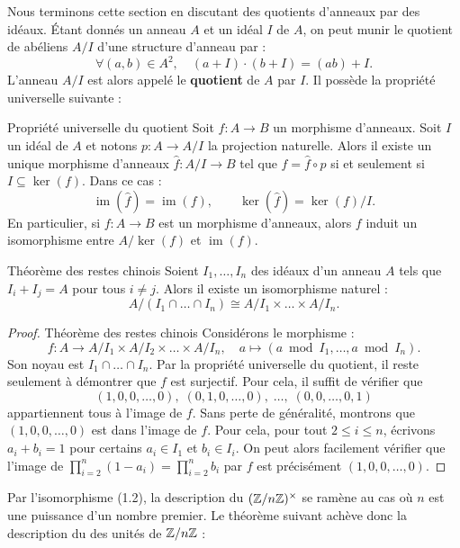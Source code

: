 \documentclass[]{report}
\begin{document}
Nous terminons cette section en discutant des quotients d'anneaux par des idéaux. Étant donnés un anneau $A$ et un idéal $I$ de $A$, on peut munir le quotient de \grs abéliens $A/I$ d'une structure d'anneau par :
\[\forall (a, b) \in A^2, \quad (a + I) \cdot (b + I) = (ab) + I.\]
L'anneau $A/I$ est alors appelé le \textbf{quotient} de $A$ par $I$. Il possède la propriété universelle suivante :

\begin{tm}{Propriété universelle du quotient}{}
    Soit $f : A \to B$ un morphisme d'anneaux. Soit $I$ un idéal de $A$ et notons $p : A \to A/I$ la projection naturelle. Alors il existe un unique morphisme d'anneaux $\hat{f} : A/I \to B$ tel que $f = \hat{f} \circ p$ si et seulement si $I \subseteq \ker(f)$. Dans ce cas :
    \[\operatorname{im}(\hat{f}) = \operatorname{im}(f), \qquad \ker(\hat{f}) = \ker(f)/I.\]
    En particulier, si $f : A \to B$ est un morphisme d'anneaux, alors $f$ induit un isomorphisme entre $A/\ker(f)$ et $\operatorname{im}(f)$.
\end{tm}

\begin{tm}{Théorème des restes chinois}{}
    Soient $I_1, \ldots, I_n$ des idéaux d'un anneau $A$ tels que $I_i + I_j = A$ pour tous $i \neq j$. Alors il existe un isomorphisme naturel :
    \[A/(I_1 \cap \dots \cap I_n) \cong A/I_1 \times \dots \times A/I_n.\]
\end{tm}

\begin{proof}{Théorème des restes chinois}{}
    Considérons le morphisme :
    \[f : A \to A/I_1 \times A/I_2 \times \dots \times A/I_n, \quad a \mapsto (a \bmod I_1, \dots, a \bmod I_n).\]
    Son noyau est $I_1 \cap \ldots \cap I_n$. Par la propriété universelle du quotient, il reste seulement à démontrer que $f$ est surjectif. Pour cela, il suffit de vérifier que
    \[(1, 0, 0, \dots, 0), \; (0, 1, 0, \dots, 0), \; \dots, \; (0, 0, \dots, 0, 1)\]
    appartiennent tous à l'image de $f$. Sans perte de généralité, montrons que $(1, 0, 0, \ldots, 0)$ est dans l'image de $f$. Pour cela, pour tout $2 \le i \le n$, écrivons $a_i + b_i = 1$ pour certains $a_i \in I_1$ et $b_i \in I_i$. On peut alors facilement vérifier que l'image de $\prod_{i=2}^{n}(1 - a_i) = \prod_{i=2}^{n} b_i$ par $f$ est précisément $(1, 0, 0, \ldots, 0)$.
\end{proof}

Par l'isomorphisme (1.2), la description du \gr $(\mathbb{Z}/n\mathbb{Z})^{\times}$ se ramène au cas où $n$ est une puissance d'un nombre premier. Le théorème suivant achève donc la description du \gr des unités de $\mathbb{Z}/n\mathbb{Z}$ :
\end{document}
